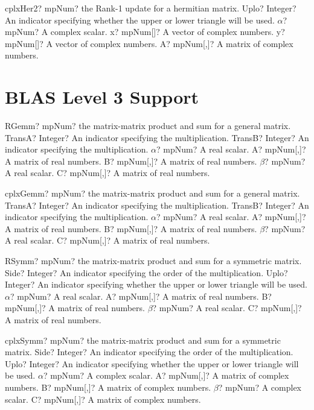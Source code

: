 \documentclass[12pt,a4paper,openany]{book}
\begin{document}
\begin{mpFunctionsExtract}
\mpFunctionFive
{cplxHer2? mpNum? the Rank-1 update for a hermitian matrix.}
{Uplo? Integer? An indicator specifying whether the upper or lower triangle will be used.}
{$\alpha$? mpNum? A complex scalar.}
{x? mpNum[]? A vector of complex numbers.}
{y? mpNum[]? A vector of complex numbers.}
{A? mpNum[,]? A matrix of complex numbers.}
\end{mpFunctionsExtract}

\section{BLAS Level 3 Support}

\begin{mpFunctionsExtract}
\mpFunctionSeven
{RGemm? mpNum? the matrix-matrix product and sum for a general matrix.}
{TransA? Integer? An indicator specifying the multiplication.}
{TransB? Integer? An indicator specifying the multiplication.}
{$\alpha$? mpNum? A real scalar.}
{A? mpNum[,]? A matrix of real numbers.}
{B? mpNum[,]? A matrix of real numbers.}
{$\beta$? mpNum? A real scalar.}
{C? mpNum[,]? A matrix of real numbers.}
\end{mpFunctionsExtract}

\begin{mpFunctionsExtract}
\mpFunctionSeven
{cplxGemm? mpNum? the matrix-matrix product and sum for a general matrix.}
{TransA? Integer? An indicator specifying the multiplication.}
{TransB? Integer? An indicator specifying the multiplication.}
{$\alpha$? mpNum? A real scalar.}
{A? mpNum[,]? A matrix of real numbers.}
{B? mpNum[,]? A matrix of real numbers.}
{$\beta$? mpNum? A real scalar.}
{C? mpNum[,]? A matrix of real numbers.}
\end{mpFunctionsExtract}

\begin{mpFunctionsExtract}
\mpFunctionSeven
{RSymm? mpNum? the matrix-matrix product and sum for a symmetric matrix.}
{Side? Integer? An indicator specifying the order of the multiplication.}
{Uplo? Integer? An indicator specifying whether the upper or lower triangle will be used.}
{$\alpha$? mpNum? A real scalar.}
{A? mpNum[,]? A matrix of real numbers.}
{B? mpNum[,]? A matrix of real numbers.}
{$\beta$? mpNum? A real scalar.}
{C? mpNum[,]? A matrix of real numbers.}
\end{mpFunctionsExtract}

\begin{mpFunctionsExtract}
\mpFunctionSeven
{cplxSymm? mpNum? the matrix-matrix product and sum for a symmetric matrix.}
{Side? Integer? An indicator specifying the order of the multiplication.}
{Uplo? Integer? An indicator specifying whether the upper or lower triangle will be used.}
{$\alpha$? mpNum? A complex scalar.}
{A? mpNum[,]? A matrix of complex numbers.}
{B? mpNum[,]? A matrix of complex numbers.}
{$\beta$? mpNum? A complex scalar.}
{C? mpNum[,]? A matrix of complex numbers.}
\end{mpFunctionsExtract}
\end{document}

